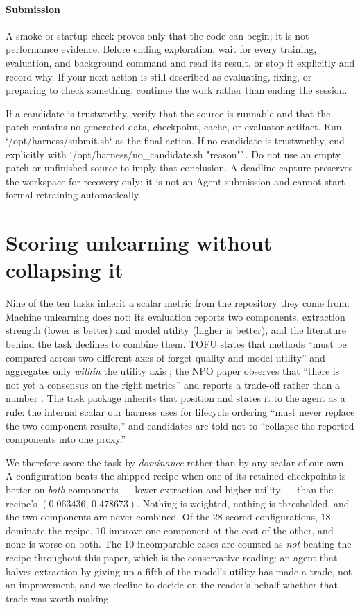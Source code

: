 \paragraph{Submission}

A smoke or startup check proves only that the code can begin; it is not performance evidence. Before ending exploration, wait for every training, evaluation, and background command and read its result, or stop it explicitly and record why. If your next action is still described as evaluating, fixing, or preparing to check something, continue the work rather than ending the session.

If a candidate is trustworthy, verify that the source is runnable and that the patch contains no generated data, checkpoint, cache, or evaluator artifact. Run `/opt/harness/submit.sh` as the final action. If no candidate is trustworthy, end explicitly with `/opt/harness/no\_candidate.sh "reason"`. Do not use an empty patch or unfinished source to imply that conclusion. A deadline capture preserves the workspace for recovery only; it is not an Agent submission and cannot start formal retraining automatically.

\endgroup

\section{Scoring unlearning without collapsing it}
\label{app:unlearning}

Nine of the ten tasks inherit a scalar metric from the repository they come from. Machine unlearning
does not: its evaluation reports two components, extraction strength (lower is better) and model
utility (higher is better), and the literature behind the task declines to combine them. TOFU states
that methods ``must be compared across two different axes of forget quality and model utility'' and
aggregates only \emph{within} the utility axis \citep{maini2024tofu}; the NPO paper observes that
``there is not yet a consensus on the right metrics'' and reports a trade-off rather than a number
\citep{zhang2024npo}. The task package inherits that position and states it to the agent as a rule:
the internal scalar our harness uses for lifecycle ordering ``must never replace the two component
results,'' and candidates are told not to ``collapse the reported components into one proxy.''

We therefore score the task by \emph{dominance} rather than by any scalar of our own. A configuration
beats the shipped recipe when one of its retained checkpoints is better on \emph{both} components ---
lower extraction and higher utility --- than the recipe's $(0.063436,\,0.478673)$. Nothing is weighted,
nothing is thresholded, and the two components are never combined. Of the $28$ scored configurations,
$18$ dominate the recipe, $10$ improve one component at the cost of the other, and none is worse on
both. The $10$ incomparable cases are counted as \emph{not} beating the recipe throughout this paper,
which is the conservative reading: an agent that halves extraction by giving up a fifth of the model's
utility has made a trade, not an improvement, and we decline to decide on the reader's behalf whether
that trade was worth making.

